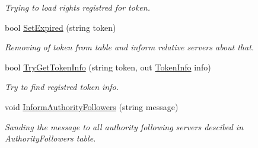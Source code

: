 \begin{DoxyCompactItemize}
\begin{DoxyCompactList}\small\item\em Trying to load rights registred for token. \end{DoxyCompactList}\item 
bool \mbox{\hyperlink{class_authority_controller_1_1_session_a811b23b70e61ac567ec8eeb54641ffcd}{Set\+Expired}} (string token)
\begin{DoxyCompactList}\small\item\em Removing of token from table and inform relative servers about that. \end{DoxyCompactList}\item 
bool \mbox{\hyperlink{class_authority_controller_1_1_session_abdd6c48f989b28cc9b3838dbe569edc6}{Try\+Get\+Token\+Info}} (string token, out \mbox{\hyperlink{class_authority_controller_1_1_data_1_1_temporal_1_1_token_info}{Token\+Info}} info)
\begin{DoxyCompactList}\small\item\em Try to find registred token info. \end{DoxyCompactList}\item 
void \mbox{\hyperlink{class_authority_controller_1_1_session_a46ef72d5e8b812ae7ecd5bf413a320f0}{Inform\+Authority\+Followers}} (string message)
\begin{DoxyCompactList}\small\item\em Sanding the message to all authority following servers descibed in Authority\+Followers table. \end{DoxyCompactList}\end{DoxyCompactItemize}
